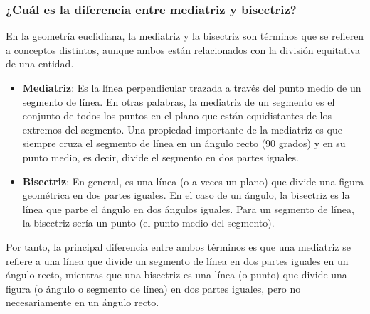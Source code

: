 \subsubsection{¿Cuál es la diferencia entre mediatriz y bisectriz?}

En la geometría euclidiana, la mediatriz y la bisectriz son términos que se refieren a conceptos distintos, aunque ambos están relacionados con la división equitativa de una entidad.

\begin{itemize}
    \item \textbf{Mediatriz}: Es la línea perpendicular trazada a través del punto medio de un segmento de línea. En otras palabras, la mediatriz de un segmento es el conjunto de todos los puntos en el plano que están equidistantes de los extremos del segmento. Una propiedad importante de la mediatriz es que siempre cruza el segmento de línea en un ángulo recto (90 grados) y en su punto medio, es decir, divide el segmento en dos partes iguales.

    \item \textbf{Bisectriz}: En general, es una línea (o a veces un plano) que divide una figura geométrica en dos partes iguales. En el caso de un ángulo, la bisectriz es la línea que parte el ángulo en dos ángulos iguales. Para un segmento de línea, la bisectriz sería un punto (el punto medio del segmento).
\end{itemize}

Por tanto, la principal diferencia entre ambos términos es que una mediatriz se refiere a una línea que divide un segmento de línea en dos partes iguales en un ángulo recto, mientras que una bisectriz es una línea (o punto) que divide una figura (o ángulo o segmento de línea) en dos partes iguales, pero no necesariamente en un ángulo recto.

